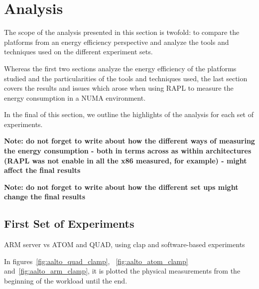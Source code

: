 \chapter{Analysis}



The scope of the analysis presented in this section is twofold: to compare the
platforms from an energy efficiency perspective and analyze the tools and techniques used on the different experiment sets. 

Whereas the first two sections analyze the energy efficiency of the platforms
studied and the particularities of the tools and techniques used, the last 
section covers the results and issues which arose when using RAPL to measure 
the energy consumption in a NUMA environment.

In the final of this section, we outline the highlights of the analysis for
each set of experiments.

\textbf{Note: do not forget to write about how the different ways of measuring
the energy consumption - both in terms across as within architectures (RAPL was
not enable in all the x86 measured, for example) - might affect the final results}

\textbf{Note: do not forget to write about how the different set ups might
change the final results}


\section{First Set of Experiments}
ARM server vs ATOM and QUAD, using clap and software-based experiments

In figures~\ref{fig:aalto_quad_clamp}, ~\ref{fig:aalto_atom_clamp} 
and~\ref{fig:aalto_arm_clamp}, it is plotted the physical measurements from the
beginning of the workload until the end.

